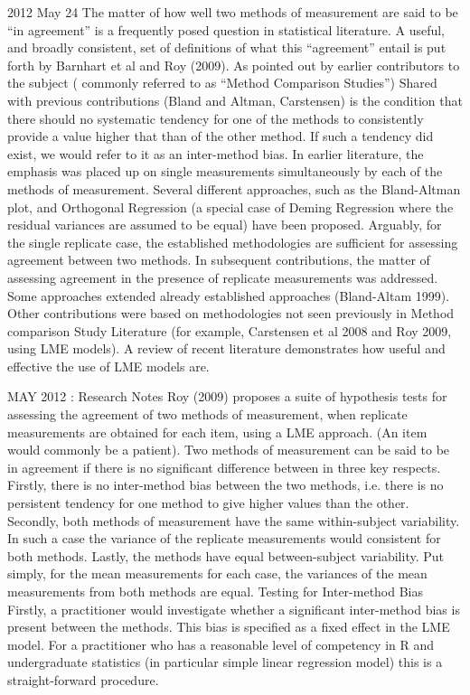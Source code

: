 \documentclass[12pt, a4paper]{report}
\theoremstyle{plain}
\theoremstyle{definition}
\theoremstyle{remark}
\begin{document}
2012 May 24
The matter of how well two methods of measurement are said to be “in agreement” is a frequently posed question in statistical literature. A useful, and broadly consistent, set of definitions of what this “agreement” entail is put forth by Barnhart et al and Roy (2009). 
As pointed out by earlier contributors to the subject ( commonly referred to as “Method Comparison Studies”)
Shared with previous contributions (Bland and Altman, Carstensen) is the condition that there should no systematic  tendency for one of the methods to consistently provide a value higher that than of the other method. If such a tendency did exist, we would refer to it as an inter-method bias.
In earlier literature, the emphasis was placed up on single measurements simultaneously by each of the methods of measurement. Several different approaches, such as the Bland-Altman plot, and Orthogonal Regression (a special case of Deming Regression where the residual variances are assumed to be equal) have been proposed. Arguably, for the single replicate case, the established methodologies are sufficient for assessing agreement between two methods.
In subsequent contributions, the matter of assessing agreement in the presence  of replicate measurements was addressed. Some approaches extended already established approaches (Bland-Altam 1999).  Other contributions were based on methodologies not seen previously in Method comparison Study Literature  (for example, Carstensen et al 2008 and Roy 2009, using LME models). 
A review of recent literature demonstrates how useful and effective the use of LME models are.


MAY 2012 : Research Notes
Roy (2009) proposes a suite of hypothesis tests for assessing the agreement of two methods of measurement, when replicate measurements are obtained for each item, using a LME approach. (An item would commonly be a patient).  Two methods of measurement can be said to be in agreement if there is no significant difference between in three key respects. Firstly, there is no inter-method bias between the two methods, i.e. there is no persistent tendency for one method to give higher values than the other.
Secondly, both methods of measurement have the same  within-subject variability. In such a case the variance of the replicate measurements would consistent for both methods.
Lastly, the methods have equal between-subject variability.  Put simply, for the mean measurements for each case, the variances of the mean measurements from both methods are equal.
Testing for Inter-method Bias
Firstly, a practitioner would investigate whether a significant inter-method bias is present between the methods. This bias is specified as a fixed effect in the LME model.  For a practitioner who has a reasonable level of competency in R and undergraduate statistics (in particular simple linear regression model) this is a straight-forward procedure.
\end{document}
